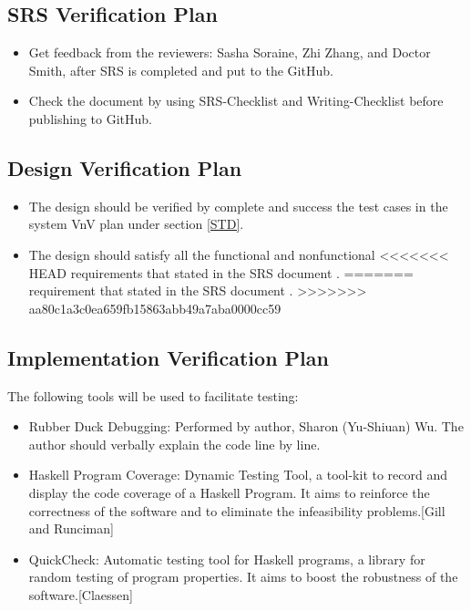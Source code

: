 \documentclass[12pt, titlepage]{article}
\begin{document}
\subsection{SRS Verification Plan}

\begin{itemize}

\item Get feedback from the reviewers: Sasha Soraine, Zhi Zhang, and Doctor
Smith, after SRS is completed and put to the GitHub.
\item Check the document by using SRS-Checklist and Writing-Checklist before
publishing to GitHub.

\end{itemize}


\subsection{Design Verification Plan}
\begin{itemize}

\item The design should be verified by complete and success the test cases in
the system VnV plan under section \ref{STD}.
\item The design should satisfy all the functional and nonfunctional
<<<<<<< HEAD
requirements that stated in the SRS document \cite{YS2019}.
=======
requirement that stated in the SRS document \cite{YS2019}.
>>>>>>> aa80c1a3c0ea659fb15863abb49a7aba0000cc59

\end{itemize}


\label{Planfordv}

\subsection{Implementation Verification Plan} 
The following tools will be used to facilitate testing: 

\begin{itemize}
\item[ ]Rubber Duck Debugging: Performed by author, Sharon (Yu-Shiuan) Wu. The 
author should verbally explain the code line by line.
\item[ ]Haskell Program Coverage: Dynamic Testing Tool, a tool-kit to record 
and display the code coverage of a Haskell Program. It aims to reinforce the 
correctness of the software and to eliminate the infeasibility problems.[Gill
and Runciman] \cite{GillandRunciman}
\item[ ]QuickCheck: Automatic testing tool for Haskell programs, a library for
random testing of program properties. It aims to boost the robustness of the 
software.[Claessen] \cite{QuickCheck}
		
\end{itemize} 
\end{document}
